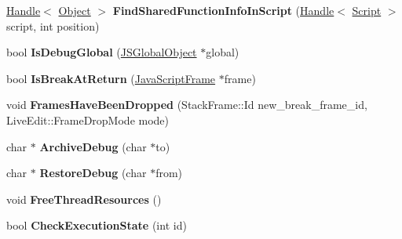 \begin{DoxyCompactItemize}
\item 
\hyperlink{classv8_1_1internal_1_1_handle}{Handle}$<$ \hyperlink{classv8_1_1internal_1_1_object}{Object} $>$ {\bfseries Find\+Shared\+Function\+Info\+In\+Script} (\hyperlink{classv8_1_1internal_1_1_handle}{Handle}$<$ \hyperlink{classv8_1_1internal_1_1_script}{Script} $>$ script, int position)\hypertarget{classv8_1_1internal_1_1_debug_ab79ead073168530c9004cc0f31ec7fb9}{}\label{classv8_1_1internal_1_1_debug_ab79ead073168530c9004cc0f31ec7fb9}

\item 
bool {\bfseries Is\+Debug\+Global} (\hyperlink{classv8_1_1internal_1_1_j_s_global_object}{J\+S\+Global\+Object} $\ast$global)\hypertarget{classv8_1_1internal_1_1_debug_a828ebd9b9616ec30d5fe1a19ad5f3d48}{}\label{classv8_1_1internal_1_1_debug_a828ebd9b9616ec30d5fe1a19ad5f3d48}

\item 
bool {\bfseries Is\+Break\+At\+Return} (\hyperlink{classv8_1_1internal_1_1_java_script_frame}{Java\+Script\+Frame} $\ast$frame)\hypertarget{classv8_1_1internal_1_1_debug_af5fc31cb9511b4fcf59263b3c30ab670}{}\label{classv8_1_1internal_1_1_debug_af5fc31cb9511b4fcf59263b3c30ab670}

\item 
void {\bfseries Frames\+Have\+Been\+Dropped} (Stack\+Frame\+::\+Id new\+\_\+break\+\_\+frame\+\_\+id, Live\+Edit\+::\+Frame\+Drop\+Mode mode)\hypertarget{classv8_1_1internal_1_1_debug_a347cb0d950b6004f85ab578163c77a90}{}\label{classv8_1_1internal_1_1_debug_a347cb0d950b6004f85ab578163c77a90}

\item 
char $\ast$ {\bfseries Archive\+Debug} (char $\ast$to)\hypertarget{classv8_1_1internal_1_1_debug_a728b6f78ff43400533ea5c0c5ac00f19}{}\label{classv8_1_1internal_1_1_debug_a728b6f78ff43400533ea5c0c5ac00f19}

\item 
char $\ast$ {\bfseries Restore\+Debug} (char $\ast$from)\hypertarget{classv8_1_1internal_1_1_debug_adecb3c22088fc338ea44d910ae2158aa}{}\label{classv8_1_1internal_1_1_debug_adecb3c22088fc338ea44d910ae2158aa}

\item 
void {\bfseries Free\+Thread\+Resources} ()\hypertarget{classv8_1_1internal_1_1_debug_a85b2eb55cc26c9140c90a82c73f45da8}{}\label{classv8_1_1internal_1_1_debug_a85b2eb55cc26c9140c90a82c73f45da8}

\item 
bool {\bfseries Check\+Execution\+State} (int id)\hypertarget{classv8_1_1internal_1_1_debug_aa86dac125edb147a696969fd0dde963e}{}\label{classv8_1_1internal_1_1_debug_aa86dac125edb147a696969fd0dde963e}


\end{DoxyCompactItemize}
